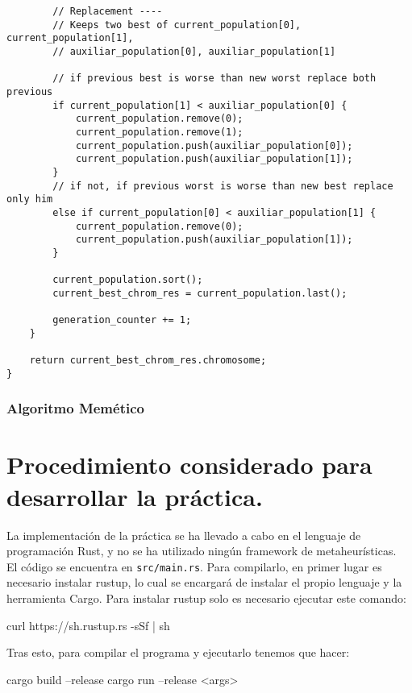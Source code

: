 \documentclass[size=a4, parskip=half, titlepage=false, toc=flat, toc=bib, 12pt]{scrartcl}
\begin{document}
\begin{verbatim}
        // Replacement ----
        // Keeps two best of current_population[0], current_population[1],
        // auxiliar_population[0], auxiliar_population[1]

        // if previous best is worse than new worst replace both previous
        if current_population[1] < auxiliar_population[0] {
            current_population.remove(0);
            current_population.remove(1);
            current_population.push(auxiliar_population[0]);
            current_population.push(auxiliar_population[1]);
        }
        // if not, if previous worst is worse than new best replace only him
        else if current_population[0] < auxiliar_population[1] {
            current_population.remove(0);
            current_population.push(auxiliar_population[1]);
        }

        current_population.sort();
        current_best_chrom_res = current_population.last();

        generation_counter += 1;
    }

    return current_best_chrom_res.chromosome;
}

\end{verbatim}

\subsubsection{Algoritmo Memético}
\newpage
\section{Procedimiento considerado para desarrollar la práctica.}
La implementación de la práctica se ha llevado a cabo en el lenguaje de programación Rust, y no se ha utilizado ningún framework de metaheurísticas.\\

El código se encuentra en \texttt{src/main.rs}. Para compilarlo, en primer lugar es necesario instalar rustup, lo cual se encargará de instalar el propio lenguaje y la herramienta Cargo. Para instalar rustup solo es necesario ejecutar este comando:
\begin{shell}
curl https://sh.rustup.rs -sSf | sh
\end{shell}

Tras esto, para compilar el programa y ejecutarlo tenemos que hacer:
\begin{shell}
cargo build --release
cargo run --release <args>
\end{shell}
\end{document}
